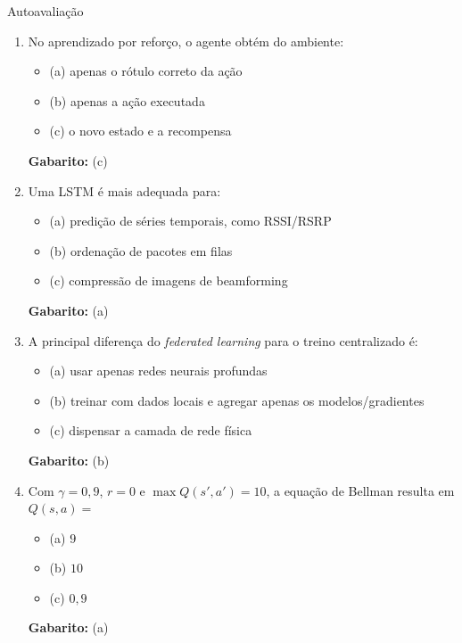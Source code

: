 \documentclass[aspectratio=169,11pt]{beamer}
\begin{document}
\begin{frame}{Autoavaliação}
  \begin{enumerate}
    \item No aprendizado por reforço, o agente obtém do ambiente:
      \begin{itemize}
        \item (a) apenas o rótulo correto da ação
        \item (b) apenas a ação executada
        \item (c) o novo estado e a recompensa
      \end{itemize}
      \pause
      \textbf{Gabarito:} (c)

    \item Uma LSTM é mais adequada para:
      \begin{itemize}
        \item (a) predição de séries temporais, como RSSI/RSRP
        \item (b) ordenação de pacotes em filas
        \item (c) compressão de imagens de beamforming
      \end{itemize}
      \pause
      \textbf{Gabarito:} (a)

    \item A principal diferença do \emph{federated learning} para o treino centralizado é:
      \begin{itemize}
        \item (a) usar apenas redes neurais profundas
        \item (b) treinar com dados locais e agregar apenas os modelos/gradientes
        \item (c) dispensar a camada de rede física
      \end{itemize}
      \pause
      \textbf{Gabarito:} (b)

    \item Com $\gamma = 0{,}9$, $r = 0$ e $\max Q(s',a') = 10$, a equação de Bellman resulta em $Q(s,a) =$
      \begin{itemize}
        \item (a) $9$
        \item (b) $10$
        \item (c) $0{,}9$
      \end{itemize}
      \pause
      \textbf{Gabarito:} (a)
  \end{enumerate}
\end{frame}
\end{document}
